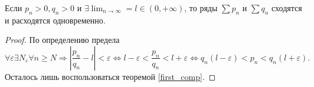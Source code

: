 \begin{theorem}
    Если $p_n > 0, q_n > 0$ и $\exists \lim_{n \to \infty} = l \in (0, +\infty)$, то ряды $\sum p_n$ и $\sum q_n$ сходятся и расходятся одновременно.
    \begin{proof}
        По определению предела
        \[
            \forall \varepsilon
            \exists N_{\varepsilon}
            \forall n \geqslant N
            \Rightarrow
            \left|
                \frac{p_n}{q_n} - l
            \right| < \varepsilon
            \Leftrightarrow
            l - \varepsilon < \frac{p_n}{q_n} < l + \varepsilon
            \Leftrightarrow
            q_n(l - \varepsilon) < p_n < q_n(l + \varepsilon).
        \]
        Осталось лишь воспользоваться теоремой \ref{first_comp}.
    \end{proof}
\end{theorem}